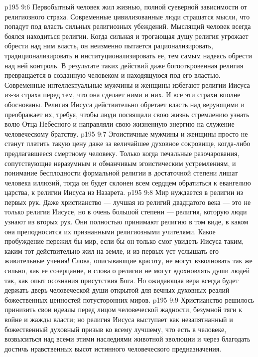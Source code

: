 \vs p195 9:6 \pc Первобытный человек жил жизнью, полной суеверной зависимости от религиозного страха. Современные цивилизованные люди страшатся мысли, что попадут под власть сильных религиозных убеждений. Мыслящий человек всегда боялся находиться  религии. Когда сильная и трогающая душу религия угрожает обрести над ним власть, он неизменно пытается рационализировать, традиционализировать и институционализировать ее, тем самым надеясь обрести над ней контроль. В результате таких действий даже богооткровенная религия превращается в созданную человеком и находящуюся под его властью. Современные интеллектуальные мужчины и женщины избегают религии Иисуса из\hyp{}за страха перед тем, что она сделает  ними и  них. И все эти страхи вполне обоснованы. Религия Иисуса действительно обретает власть над верующими и преображает их, требуя, чтобы люди посвящали свою жизнь стремлению узнать волю Отца Небесного и направляли свою жизненную энергию на служение человеческому братству.
\vs p195 9:7 Эгоистичные мужчины и женщины просто не станут платить такую цену даже за величайшее духовное сокровище, когда\hyp{}либо предлагавшееся смертному человеку. Только когда печальные разочарования, сопутствующие неразумным и обманчивым эгоистическим устремлениям, и понимание бесплодности формальной религии в достаточной степени лишат человека иллюзий, тогда он будет склонен всем сердцем обратиться к евангелию царства, к религии Иисуса из Назарета.
\vs p195 9:8 Мир нуждается в религии из первых рук. Даже христианство --- лучшая из религий двадцатого века --- это не только религия  Иисусе, но в очень большой степени --- религия, которую люди узнают из вторых рук. Они полностью принимают религию в том виде, в каком она преподносится их признанными религиозными учителями. Какое пробуждение пережил бы мир, если бы он только смог увидеть Иисуса таким, каким тот действительно жил на земле, и из первых уст услышать его живительные учения! Слова, описывающие красоту, не могут взволновать так же сильно, как ее созерцание, и слова о религии не могут вдохновлять души людей так, как опыт осознания присутствия Бога. Но ожидающая вера всегда будет держать дверь человеческой души открытой для вечных духовных реалий божественных ценностей потусторонних миров.
\vs p195 9:9 \pc Христианство решилось принизить свои идеалы перед лицом человеческой жадности, безумной тяги к войне и жажды власти; но религия Иисуса выступает как незапятнанный и божественный духовный призыв ко всему лучшему, что есть в человеке, возвыситься над всеми этими наследиями животной эволюции и через благодать достичь нравственных высот истинного человеческого предназначения.
